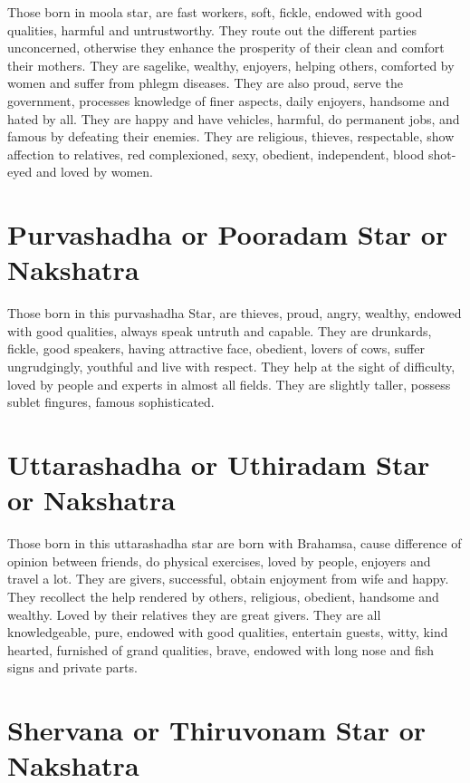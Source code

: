 \documentclass[12pt, right open]{memoir}
\begin{document}
Those born in moola star, are fast workers, soft, fickle, endowed with good qualities, harmful and untrustworthy. They route out the different parties unconcerned, otherwise they enhance the prosperity of their clean and comfort their mothers. They are sagelike, wealthy, enjoyers, helping others, comforted by women and suffer from phlegm diseases. They are also proud, serve the government, processes knowledge of finer aspects, daily enjoyers, handsome and hated by all. They are happy and have vehicles, harmful, do permanent jobs, and famous by defeating their enemies. They are religious, thieves, respectable, show affection to relatives, red complexioned, sexy, obedient, independent, blood shot-eyed and loved by women.


\section{Purvashadha or Pooradam Star or Nakshatra}

Those born in this purvashadha Star, are thieves, proud, angry, wealthy, endowed with good qualities, always speak untruth and capable. They are drunkards, fickle, good speakers, having attractive face, obedient, lovers of cows, suffer ungrudgingly, youthful and live with respect. They help at the sight of difficulty, loved by people and experts in almost all fields. They are slightly taller, possess sublet fingures, famous sophisticated.


\section{Uttarashadha or Uthiradam Star or Nakshatra}

Those born in this uttarashadha star are born with Brahamsa, cause difference of opinion between friends, do physical exercises, loved by people, enjoyers and travel a lot. They are givers, successful, obtain enjoyment from wife and happy. They recollect the help rendered by others, religious, obedient, handsome and wealthy. Loved by their relatives they are great givers. They are all knowledgeable, pure, endowed with good qualities, entertain guests, witty, kind hearted, furnished of grand qualities, brave, endowed with long nose and fish signs and private parts.


\section{Shervana or Thiruvonam Star or Nakshatra}
\end{document}
